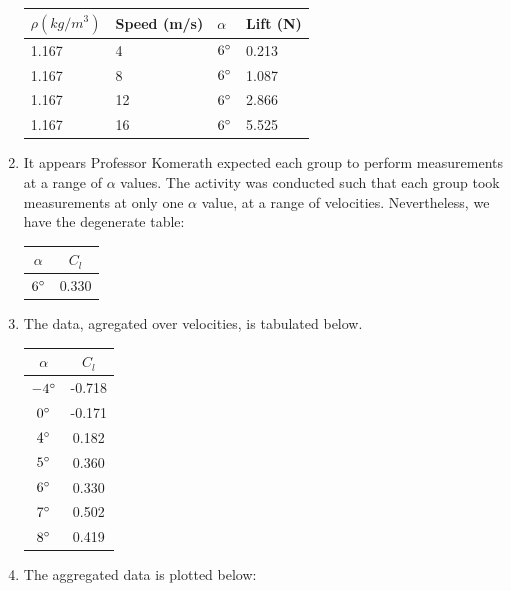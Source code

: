 \documentclass{article}
\begin{document}
\begin{enumerate}
\begin{tabular}{|l | l | l | l |}
\hline
$\rho (kg/m^3)$ & Speed (m/s) & $\alpha$ & Lift (N) \\ \hline
1.167 & 4 & $6\degree$ & 0.213 \\ \hline
1.167 & 8 & $6\degree$ & 1.087 \\ \hline
1.167 & 12 & $6\degree$ & 2.866 \\ \hline
1.167 & 16 & $6\degree$ & 5.525 \\ \hline
\end{tabular}

\item It appears Professor Komerath expected each group to perform measurements at a range of $\alpha$ values.
The activity was conducted such that each group took measurements at only one $\alpha$ value, at a range of
velocities.  Nevertheless, we have the degenerate table:

\begin{tabular}{c | c}
$\alpha$ & $C_l$ \\ \hline
$6\degree$ & 0.330 \\
\end{tabular}

\item The data, agregated over velocities, is tabulated below.

\begin{tabular}{c | c}
$\alpha$ & $C_l$ \\ \hline
$-4\degree$ & -0.718 \\ \hline 
$0\degree$ & -0.171 \\ \hline 
$4\degree$ & 0.182 \\ \hline 
$5\degree$ & 0.360 \\ \hline 
$6\degree$ & 0.330 \\ \hline 
$7\degree$ & 0.502 \\ \hline 
$8\degree$ & 0.419 \\
\end{tabular}

\item The aggregated data is plotted below:


\end{enumerate}
\end{document}
